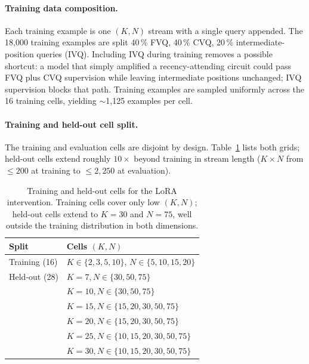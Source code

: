 \documentclass[letterpaper]{article} %
\begin{document}
\paragraph{Training data composition.}
Each training example is one $(K, N)$ stream with a single query
appended.
The 18{,}000 training examples are split 40\,\% FVQ, 40\,\% CVQ,
20\,\% intermediate-position queries (IVQ).
Including IVQ during training removes a possible shortcut: a model
that simply amplified a recency-attending circuit could pass FVQ
plus CVQ supervision while leaving intermediate positions unchanged;
IVQ supervision blocks that path.
Training examples are sampled uniformly across the 16 training
cells, yielding $\sim$1{,}125 examples per cell.

\paragraph{Training and held-out cell split.}
The training and evaluation cells are disjoint by design.
Table~\ref{tab:lora_cells} lists both grids; held-out cells extend
roughly $10\times$ beyond training in stream length ($K \times N$
from $\le 200$ at training to $\le 2{,}250$ at evaluation).

\begin{table}[!htbp]
\centering
\footnotesize
\setlength{\tabcolsep}{4pt}
\begin{tabular}{ll}
\toprule
\textbf{Split} & \textbf{Cells $(K, N)$} \\
\midrule
Training (16) & $K \in \{2, 3, 5, 10\}$, $N \in \{5, 10, 15, 20\}$ \\
\midrule
Held-out (28) & $K{=}7, N \in \{30, 50, 75\}$ \\
              & $K{=}10, N \in \{30, 50, 75\}$ \\
              & $K{=}15, N \in \{15, 20, 30, 50, 75\}$ \\
              & $K{=}20, N \in \{15, 20, 30, 50, 75\}$ \\
              & $K{=}25, N \in \{10, 15, 20, 30, 50, 75\}$ \\
              & $K{=}30, N \in \{10, 15, 20, 30, 50, 75\}$ \\
\bottomrule
\end{tabular}
\caption{Training and held-out cells for the LoRA intervention.
Training cells cover only low $(K, N)$; held-out cells extend to
$K{=}30$ and $N{=}75$, well outside the training distribution in
both dimensions.}
\label{tab:lora_cells}
\end{table}
\end{document}
